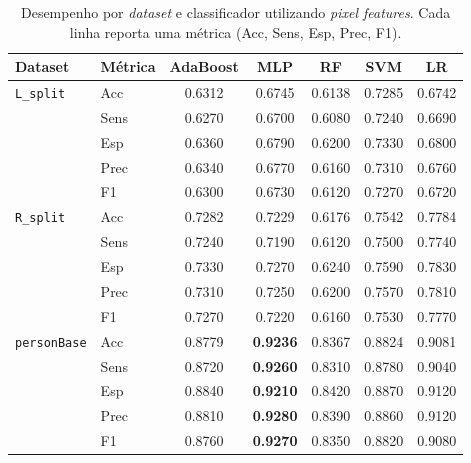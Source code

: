 \documentclass[11pt,a4paper]{article}
\begin{document}
\begin{table}[htbp]
\centering
\caption{Desempenho por \textit{dataset} e classificador utilizando \emph{pixel features}. Cada linha reporta uma métrica (Acc, Sens, Esp, Prec, F1).}
\label{tab:feat-metrics-dataset-classifier}
\small
\setlength{\tabcolsep}{4pt}
\renewcommand{\arraystretch}{1.08}
\begin{tabular}{llccccc}
\toprule
\textbf{Dataset} & \textbf{Métrica} & \textbf{AdaBoost} & \textbf{MLP} & \textbf{RF} & \textbf{SVM} & \textbf{LR} \\
\midrule
\texttt{L\_split} & Acc  & 0.6312 & 0.6745 & 0.6138 & 0.7285 & 0.6742 \\
                 & Sens & 0.6270 & 0.6700 & 0.6080 & 0.7240 & 0.6690 \\
                 & Esp  & 0.6360 & 0.6790 & 0.6200 & 0.7330 & 0.6800 \\
                 & Prec & 0.6340 & 0.6770 & 0.6160 & 0.7310 & 0.6760 \\
                 & F1   & 0.6300 & 0.6730 & 0.6120 & 0.7270 & 0.6720 \\
\addlinespace[5pt]
\texttt{R\_split} & Acc  & 0.7282 & 0.7229 & 0.6176 & 0.7542 & 0.7784 \\
                 & Sens & 0.7240 & 0.7190 & 0.6120 & 0.7500 & 0.7740 \\
                 & Esp  & 0.7330 & 0.7270 & 0.6240 & 0.7590 & 0.7830 \\
                 & Prec & 0.7310 & 0.7250 & 0.6200 & 0.7570 & 0.7810 \\
                 & F1   & 0.7270 & 0.7220 & 0.6160 & 0.7530 & 0.7770 \\
\addlinespace[5pt]
\texttt{personBase} & Acc  & 0.8779 & \textbf{0.9236} & 0.8367 & 0.8824 & 0.9081 \\
                   & Sens & 0.8720 & \textbf{0.9260} & 0.8310 & 0.8780 & 0.9040 \\
                   & Esp  & 0.8840 & \textbf{0.9210} & 0.8420 & 0.8870 & 0.9120 \\
                   & Prec & 0.8810 & \textbf{0.9280} & 0.8390 & 0.8860 & 0.9120 \\
                   & F1   & 0.8760 & \textbf{0.9270} & 0.8350 & 0.8820 & 0.9080 \\
\bottomrule
\end{tabular}
\end{table}
\end{document}
